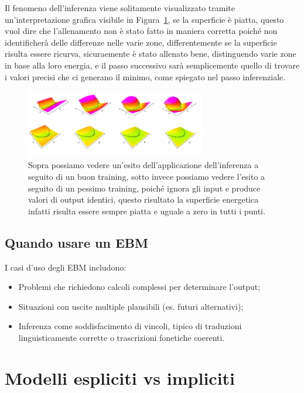 Il fenomeno dell'inferenza viene solitamente visualizzato tramite un'interpretazione grafica visibile in Figura~\ref{fig:InfGoodBad}, se la superficie è piatta, questo vuol dire che l'allenamento non è stato fatto in maniera corretta poiché non identificherà delle differenze nelle varie zone, differentemente se la superficie risulta essere ricurva, sicuraemente è stato allenato bene, distinguendo varie zone in base alla loro energia, e il passo successivo sarà semplicemente quello di trovare i valori precisi che ci generano il minimo, come spiegato nel passo inferenziale.
\begin{figure}
    \centering
    \includegraphics[width=0.7\textwidth]{figure/InferenceGoodBad.png}
    \caption{Sopra possiamo vedere un'esito dell'applicazione dell'inferenza a seguito di un buon training, sotto invece possiamo vedere l'esito a seguito di un pessimo training, poiché ignora gli input e produce valori di output identici, questo risultato la superficie energetica infatti risulta essere sempre piatta e uguale a zero in tutti i punti.}
    \label{fig:InfGoodBad}
\end{figure}

\subsection{Quando usare un EBM}
I casi d'uso degli EBM includono:
\begin{itemize}
    \item Problemi che richiedono calcoli complessi per determinare l'output;
    \item Situazioni con uscite multiple plausibili (es. futuri alternativi);
    \item Inferenza come soddisfacimento di vincoli, tipico di traduzioni linguisticamente corrette o trascrizioni fonetiche coerenti.
\end{itemize}

\section{Modelli espliciti vs impliciti}

